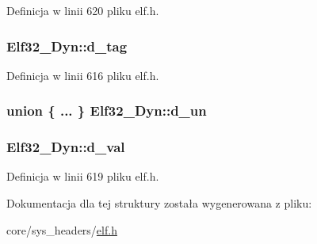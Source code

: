 Definicja w linii 620 pliku elf.\-h.

\hypertarget{struct_elf32___dyn_a0edbe45a1c49cbb352dc3e1937369180}{
\subsubsection[{d\-\_\-tag}]{ Elf32\-\_\-\-Dyn\-::d\-\_\-tag}}\label{struct_elf32___dyn_a0edbe45a1c49cbb352dc3e1937369180}


Definicja w linii 616 pliku elf.\-h.

\hypertarget{struct_elf32___dyn_ae099cc9b66d91c8d96a079c748491c99}{
\subsubsection[{d\-\_\-un}]{\setlength{\rightskip}{0pt plus 5cm}union \{ ... \}   Elf32\-\_\-\-Dyn\-::d\-\_\-un}}\label{struct_elf32___dyn_ae099cc9b66d91c8d96a079c748491c99}
\hypertarget{struct_elf32___dyn_a00a89085454a384ae77fd9112b3062c7}{
\subsubsection[{d\-\_\-val}]{ Elf32\-\_\-\-Dyn\-::d\-\_\-val}}\label{struct_elf32___dyn_a00a89085454a384ae77fd9112b3062c7}


Definicja w linii 619 pliku elf.\-h.



Dokumentacja dla tej struktury została wygenerowana z pliku\-:\begin{DoxyCompactItemize}
\item 
core/sys\-\_\-headers/\hyperlink{elf_8h}{elf.\-h}\end{DoxyCompactItemize}
